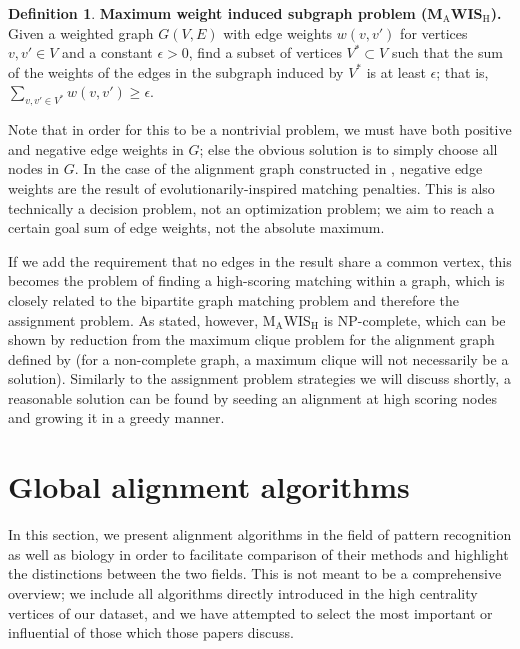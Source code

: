 \documentclass[12pt]{thesis}
\theoremstyle{plain}
\theoremstyle{definition}
\newtheorem{definition}[theorem]{Definition}
\theoremstyle{remark}
\begin{document}
\begin{definition}\textbf{Maximum weight induced subgraph problem (M$_\text{A}$WIS$_\text{H}$).}
Given a weighted graph $G(V,E)$ with edge weights $w(v,v')$ for vertices $v,v'\in V$ and a constant $\epsilon>0$, find a subset of vertices $V^*\subset V$ such that the sum of the weights of the edges in the subgraph induced by $V^*$ is at least $\epsilon$; that is, $\sum_{v,v'\in V^*} w(v,v') \geq \epsilon$.
\end{definition}

Note that in order for this to be a nontrivial problem, we must have both positive and negative edge weights in $G$; else the obvious solution is to simply choose all nodes in $G$. In the case of the alignment graph constructed in \cite{Koyuturk_2006}, negative edge weights are the result of evolutionarily-inspired matching penalties. This is also technically a decision problem, not an optimization problem; we aim to reach a certain goal sum of edge weights, not the absolute maximum.

If we add the requirement that no edges in the result share a common vertex, this becomes the problem of finding a high-scoring matching within a graph, which is closely related to the bipartite graph matching problem and therefore the assignment problem. As stated, however, M$_\text{A}$WIS$_\text{H}$ is NP-complete, which can be shown by reduction from the maximum clique problem for the alignment graph defined by \cite{Koyuturk_2006} (for a non-complete graph, a maximum clique will not necessarily be a solution). Similarly to the assignment problem strategies we will discuss shortly, a reasonable solution can be found by seeding an alignment at high scoring nodes and growing it in a greedy manner.








\section{Global alignment algorithms}

In this section, we present alignment algorithms in the field of pattern recognition as well as biology in order to facilitate comparison of their methods and highlight the distinctions between the two fields. This is not meant to be a comprehensive overview; we include all algorithms directly introduced in the high centrality vertices of our dataset, and we have attempted to select the most important or influential of those which those papers discuss. 
\end{document}
